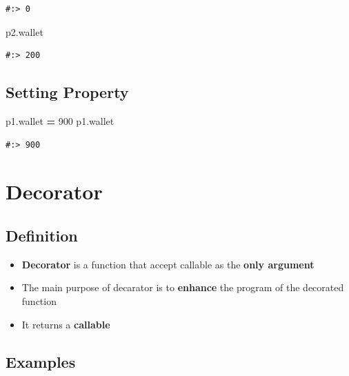 \documentclass[
]{book}
\newenvironment{Shaded}{\begin{snugshade}}{\end{snugshade}}
\newcommand{\DecValTok}[1]{\textcolor[rgb]{0.06,0.06,0.06}{#1}}
\newcommand{\NormalTok}[1]{#1}
\newcommand{\OperatorTok}[1]{\textcolor[rgb]{0.43,0.43,0.43}{\textbf{#1}}}
\providecommand{\tightlist}{%
  \setlength{\itemsep}{0pt}\setlength{\parskip}{0pt}}
\begin{document}
\begin{verbatim}
#:> 0
\end{verbatim}

\begin{Shaded}
\begin{Highlighting}[]
\NormalTok{p2.wallet}
\end{Highlighting}
\end{Shaded}

\begin{verbatim}
#:> 200
\end{verbatim}

\hypertarget{setting-property}{%
\section{Setting Property}\label{setting-property}}

\begin{Shaded}
\begin{Highlighting}[]
\NormalTok{p1.wallet }\OperatorTok{=} \DecValTok{900}
\NormalTok{p1.wallet}
\end{Highlighting}
\end{Shaded}

\begin{verbatim}
#:> 900
\end{verbatim}

\hypertarget{decorator}{%
\chapter{Decorator}\label{decorator}}

\hypertarget{definition}{%
\section{Definition}\label{definition}}

\begin{itemize}
\tightlist
\item
  \textbf{Decorator} is a function that accept callable as the \textbf{only argument}
\item
  The main purpose of decarator is to \textbf{enhance} the program of the decorated function
\item
  It returns a \textbf{callable}
\end{itemize}

\hypertarget{examples}{%
\section{Examples}\label{examples}}
\end{document}
